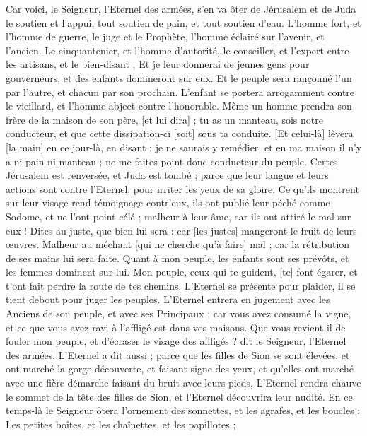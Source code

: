 \begin{multicols}{2}
\VerseOne{}Car voici, le Seigneur, l'Eternel des armées, s'en va ôter de Jérusalem et de Juda le soutien et l'appui, tout soutien de pain, et tout soutien d'eau.
L'homme fort, et l'homme de guerre, le juge et le Prophète, l'homme éclairé sur l'avenir, et l'ancien.
Le cinquantenier, et l'homme d'autorité, le conseiller, et l'expert entre les artisans, et le bien-disant ;
Et je leur donnerai de jeunes gens pour gouverneurs, et des enfants domineront sur eux.
Et le peuple sera rançonné l'un par l'autre, et chacun par son prochain. L'enfant se portera arrogamment contre le vieillard, et l'homme abject contre l'honorable.
Même un homme prendra son frère de la maison de son père, [et lui dira] ; tu as un manteau, sois notre conducteur, et que cette dissipation-ci [soit] sous ta conduite.
[Et celui-là] lèvera [la main] en ce jour-là, en disant ; je ne saurais y remédier, et en ma maison il n'y a ni pain ni manteau ; ne me faites point donc conducteur du peuple.
Certes Jérusalem est renversée, et Juda est tombé ; parce que leur langue et leurs actions sont contre l'Eternel, pour irriter les yeux de sa gloire.
Ce qu'ils montrent sur leur visage rend témoignage contr'eux, ils ont publié leur péché comme Sodome, et ne l'ont point célé ; malheur à leur âme, car ils ont attiré le mal sur eux !
Dites au juste, que bien lui sera : car [les justes] mangeront le fruit de leurs œuvres.
Malheur au méchant [qui ne cherche qu'à faire] mal ; car la rétribution de ses mains lui sera faite.
Quant à mon peuple, les enfants sont ses prévôts, et les femmes dominent sur lui. Mon peuple, ceux qui te guident, [te] font égarer, et t'ont fait perdre la route de tes chemins.
L'Eternel se présente pour plaider, il se tient debout pour juger les peuples.
L'Eternel entrera en jugement avec les Anciens de son peuple, et avec ses Principaux ; car vous avez consumé la vigne, et ce que vous avez ravi à l'affligé est dans vos maisons.
Que vous revient-il de fouler mon peuple, et d'écraser le visage des affligés ? dit le Seigneur, l'Eternel des armées.
L'Eternel a dit aussi ; parce que les filles de Sion se sont élevées, et ont marché la gorge découverte, et faisant signe des yeux, et qu'elles ont marché avec une fière démarche faisant du bruit avec leurs pieds,
L'Eternel rendra chauve le sommet de la tête des filles de Sion, et l'Eternel découvrira leur nudité.
En ce temps-là le Seigneur ôtera l'ornement des sonnettes, et les agrafes, et les boucles ;
Les petites boîtes, et les chaînettes, et les papillotes ;

\end{multicols}
